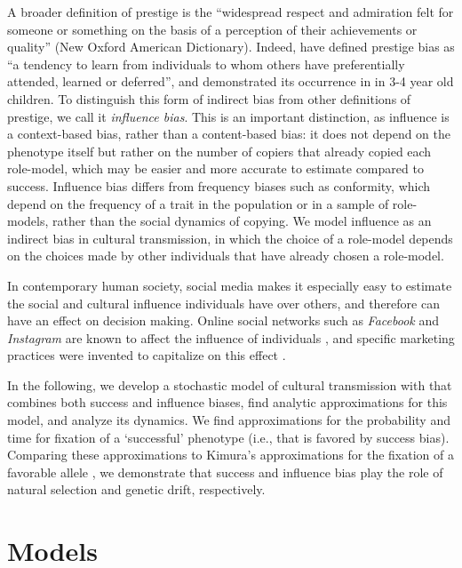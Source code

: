 \documentclass[12pt]{extarticle}
\begin{document}
A broader definition of prestige is the ``widespread respect and admiration felt for someone or something on the basis of a perception of their achievements or quality'' (New Oxford American Dictionary).
Indeed, \citet{prestige_cultural_learning} have defined prestige bias as ``a tendency to learn from individuals to whom others have preferentially attended, learned or deferred'', and demonstrated its occurrence in in 3-4 year old children.
To distinguish this form of indirect bias from other definitions of prestige, we call it \emph{influence bias}. This is an important distinction, as influence is a context-based bias, rather than a content-based bias: it does not depend on the phenotype itself but rather on the number of copiers that already copied each role-model, which may be easier and more accurate to estimate compared to success. Influence bias differs from frequency biases such as conformity, which depend on the frequency of a trait in the population or in a sample of role-models, rather than the social dynamics of copying.
We model influence as an indirect bias in cultural transmission, in which the choice of a role-model depends on the choices made by other individuals that have already chosen a role-model. 

In contemporary human society, social media makes it especially easy to estimate the social and cultural influence individuals have over others, and therefore can have an effect on decision making. Online social networks such as \emph{Facebook} and \emph{Instagram} are known to affect the influence of individuals \citep{social_influence,social_media,influence_analysis}, and specific marketing practices were invented to capitalize on this effect \citep{facebook_marketing}.

In the following, we develop a stochastic model of cultural transmission with that combines both success and influence biases, find analytic approximations for this model, and analyze its dynamics. We find approximations for the probability and time for fixation of a `successful' phenotype (i.e., that is favored by success bias). Comparing these approximations to Kimura's approximations for the fixation of a favorable allele \citep{kimura,kimura_average}, we demonstrate that success and influence bias play the role of natural selection and genetic drift, respectively. 

\section*{Models}
\end{document}
